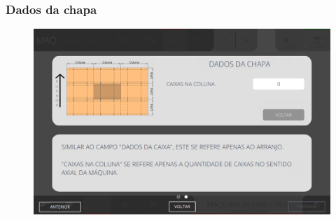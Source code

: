 \newpage
\thispagestyle{fancy}
\vspace*{40 pt}
\subsubsection{\small{Dados da chapa}} \label{sec:telaCalculoAutomaticoGuiasDadosChapa}
\vspace*{\fill}
\begin{figure}[h]
    \centering
    \includegraphics[width=576 px,height=360 px]{src/imagesICV/07-scout/settings/e-7.png}
\end{figure}
\vspace*{\fill}
